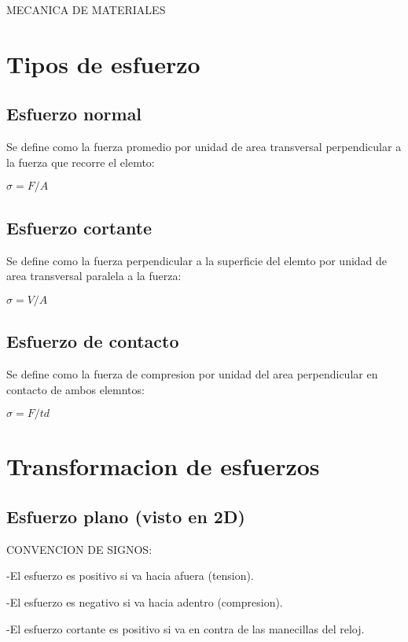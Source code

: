 \documentclass[12Pt]{article}
\begin{document}
 


\title{}
\begin{titlepage}
\begin{Huge}
 MECANICA DE MATERIALES
\end{Huge}

\section{Tipos de esfuerzo}
\subsection{Esfuerzo normal}

Se define como la fuerza promedio por unidad de area transversal perpendicular a la fuerza que recorre el elemto:

$\sigma = F/A $

\subsection{Esfuerzo cortante}

Se define como la fuerza perpendicular a la superficie del elemto por unidad de area transversal paralela a la fuerza:

$ \sigma = V/A $

\subsection{Esfuerzo de contacto}

Se define como la fuerza de compresion por unidad del area perpendicular en contacto de ambos elemntos:

$ \sigma = F/td $



\section{Transformacion de esfuerzos}

\subsection{Esfuerzo plano (visto en 2D)}

CONVENCION DE SIGNOS:

-El esfuerzo es positivo si va hacia afuera (tension).

-El esfuerzo es negativo si va hacia adentro (compresion).

-El esfuerzo cortante es positivo si va en contra de las manecillas del reloj.


\end{titlepage}
\end{document}
